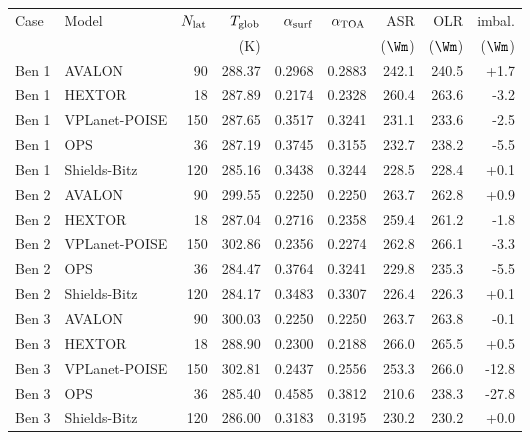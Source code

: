 \small
\begin{tabular}{llrrrrrrr}
\toprule
Case & Model & $N_{\rm lat}$ & $T_{\rm glob}$ & $\alpha_{\rm surf}$ & $\alpha_{\rm TOA}$ & ASR & OLR & imbal. \\
 & & & (K) & & & ($\Wm$) & ($\Wm$) & ($\Wm$) \\
\midrule
Ben 1 & AVALON & 90 & 288.37 & 0.2968 & 0.2883 & 242.1 & 240.5 & +1.7 \\
Ben 1 & HEXTOR & 18 & 287.89 & 0.2174 & 0.2328 & 260.4 & 263.6 & -3.2 \\
Ben 1 & VPLanet-POISE & 150 & 287.65 & 0.3517 & 0.3241 & 231.1 & 233.6 & -2.5 \\
Ben 1 & OPS & 36 & 287.19 & 0.3745 & 0.3155 & 232.7 & 238.2 & -5.5 \\
Ben 1 & Shields-Bitz & 120 & 285.16 & 0.3438 & 0.3244 & 228.5 & 228.4 & +0.1 \\
\addlinespace
Ben 2 & AVALON & 90 & 299.55 & 0.2250 & 0.2250 & 263.7 & 262.8 & +0.9 \\
Ben 2 & HEXTOR & 18 & 287.04 & 0.2716 & 0.2358 & 259.4 & 261.2 & -1.8 \\
Ben 2 & VPLanet-POISE & 150 & 302.86 & 0.2356 & 0.2274 & 262.8 & 266.1 & -3.3 \\
Ben 2 & OPS & 36 & 284.47 & 0.3764 & 0.3241 & 229.8 & 235.3 & -5.5 \\
Ben 2 & Shields-Bitz & 120 & 284.17 & 0.3483 & 0.3307 & 226.4 & 226.3 & +0.1 \\
\addlinespace
Ben 3 & AVALON & 90 & 300.03 & 0.2250 & 0.2250 & 263.7 & 263.8 & -0.1 \\
Ben 3 & HEXTOR & 18 & 288.90 & 0.2300 & 0.2188 & 266.0 & 265.5 & +0.5 \\
Ben 3 & VPLanet-POISE & 150 & 302.81 & 0.2437 & 0.2556 & 253.3 & 266.0 & -12.8 \\
Ben 3 & OPS & 36 & 285.40 & 0.4585 & 0.3812 & 210.6 & 238.3 & -27.8 \\
Ben 3 & Shields-Bitz & 120 & 286.00 & 0.3183 & 0.3195 & 230.2 & 230.2 & +0.0 \\
\bottomrule
\end{tabular}
